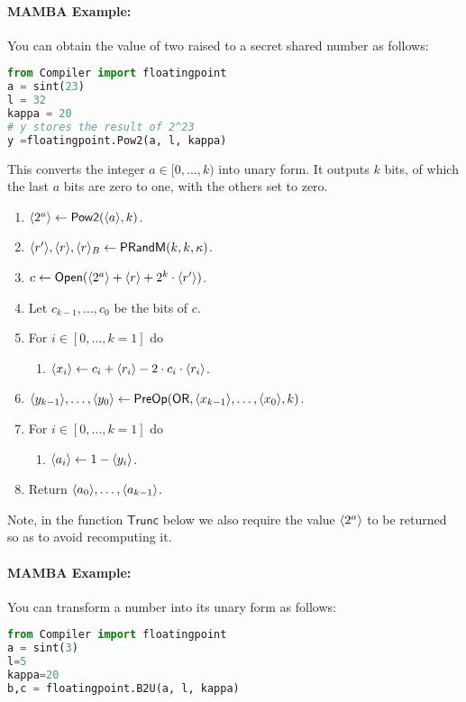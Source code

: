 \paragraph{MAMBA Example:} You can obtain the value of two raised to a secret shared number as follows: 
\begin{lstlisting}[language={python}]
from Compiler import floatingpoint
a = sint(23)
l = 32
kappa = 20
# y stores the result of 2^23
y =floatingpoint.Pow2(a, l, kappa)
\end{lstlisting}


This converts the integer $a \in [0,\ldots,k)$ into unary form.
It outputs $k$ bits, of which the last $a$ bits are zero to one,
with the others set to zero.
\begin{enumerate}
\item $\langle 2^a \rangle \leftarrow \mathsf{Pow2}(\langle a \rangle,k)$.
\item $\langle r' \rangle, \langle r \rangle, \langle r \rangle_B \leftarrow \mathsf{PRandM}(k,k,\kappa)$.
\item $c \leftarrow {\mathsf{Open}}(\langle 2^a \rangle+\langle r \rangle+2^k \cdot \langle r' \rangle)$.
\item Let $c_{k-1},\ldots,c_0$ be the bits of $c$.
\item For $i \in [0,\ldots,k=1]$ do
\begin{enumerate}
	\item $\langle x_i \rangle \leftarrow c_i+\langle r_i \rangle-2 \cdot c_i \cdot \langle r_i \rangle$.
\end{enumerate}
\item $\langle y_{k-1} \rangle,\ldots,\langle y_0 \rangle \leftarrow \mathsf{PreOp}(\mathsf{OR},\langle x_{k-1} \rangle,\ldots,\langle x_0 \rangle,k)$.
\item For $i \in [0,\ldots,k=1]$ do
\begin{enumerate}
	\item $\langle a_i \rangle \leftarrow 1-\langle y_i \rangle$.
\end{enumerate}
\item Return $\langle a_0 \rangle,\ldots,\langle a_{k-1} \rangle$.
\end{enumerate}
Note, in the function $\mathsf{Trunc}$ below we also require the
value $\langle 2^a \rangle$ to be returned so as to avoid recomputing it.

\paragraph{MAMBA Example:} You can transform a number into its unary form as follows: 
\begin{lstlisting}[language={python}]
from Compiler import floatingpoint
a = sint(3)
l=5
kappa=20
b,c = floatingpoint.B2U(a, l, kappa)
\end{lstlisting}


